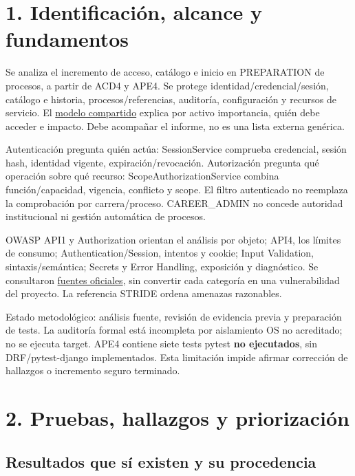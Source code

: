 \documentclass[12pt,a4paper]{report}
\begin{document}
\chapter{1. Identificación, alcance y
fundamentos}\label{AA4-semana-4-1-identificaciuxf3n-alcance-y-fundamentos}

Se analiza el incremento de acceso, catálogo e inicio en PREPARATION de
procesos, a partir de ACD4 y APE4. Se protege
identidad/credencial/sesión, catálogo e historia, procesos/referencias,
auditoría, configuración y recursos de servicio. El
\href{../soporte-semanas-4-5/MATRIZ_AMENAZAS.md}{modelo compartido}
explica por activo importancia, quién debe acceder e impacto. Debe
acompañar el informe, no es una lista externa genérica.

Autenticación pregunta quién actúa: SessionService comprueba credencial,
sesión hash, identidad vigente, expiración/revocación. Autorización
pregunta qué operación sobre qué recurso: ScopeAuthorizationService
combina función/capacidad, vigencia, conflicto y scope. El filtro
autenticado no reemplaza la comprobación por carrera/proceso.
CAREER\_ADMIN no concede autoridad institucional ni gestión automática
de procesos.

OWASP API1 y Authorization orientan el análisis por objeto; API4, los
límites de consumo; Authentication/Session, intentos y cookie; Input
Validation, sintaxis/semántica; Secrets y Error Handling, exposición y
diagnóstico. Se consultaron
\href{../soporte-semanas-4-5/FUENTES.md}{fuentes oficiales}, sin
convertir cada categoría en una vulnerabilidad del proyecto. La
referencia STRIDE ordena amenazas razonables.

Estado metodológico: análisis fuente, revisión de evidencia previa y
preparación de tests. La auditoría formal está incompleta por
aislamiento OS no acreditado; no se ejecuta target. APE4 contiene siete
tests pytest \textbf{no ejecutados}, sin DRF/pytest-django
implementados. Esta limitación impide afirmar corrección de hallazgos o
incremento seguro terminado.

\chapter{2. Pruebas, hallazgos y
priorización}\label{AA4-semana-4-2-pruebas-hallazgos-y-priorizaciuxf3n}

\section{Resultados que sí existen y su
procedencia}\label{AA4-semana-4-resultados-que-suxed-existen-y-su-procedencia}
\end{document}
